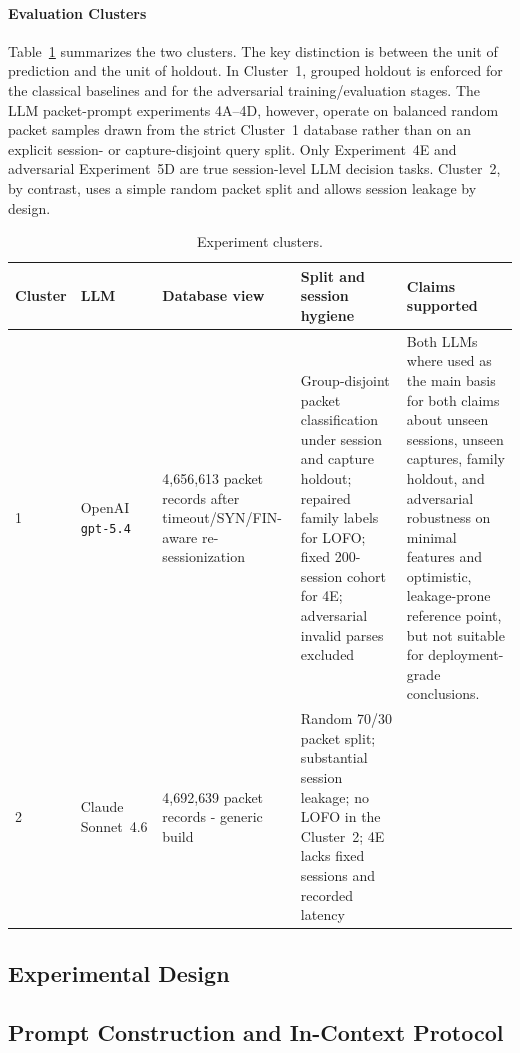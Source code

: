 \documentclass[conference]{IEEEtran}
\begin{document}
\paragraph{Evaluation Clusters}
Table~\ref{tab:clusters} summarizes the two clusters. The key distinction is between the unit of prediction and the unit of holdout. In Cluster~1, grouped holdout is enforced for the classical baselines and for the adversarial training/evaluation stages. The LLM packet-prompt experiments 4A--4D, however, operate on balanced random packet samples drawn from the strict Cluster~1 database rather than on an explicit session- or capture-disjoint query split. Only Experiment~4E and adversarial Experiment~5D are true session-level LLM decision tasks. Cluster~2, by contrast, uses a simple random packet split and allows session leakage by design.

\begin{table}[t]
\centering
\caption{Experiment clusters.}
\label{tab:clusters}
\footnotesize
\begin{tabularx}{\textwidth}{p{1.0cm}p{2.0cm}p{1.9cm}X X}
\toprule
Cluster & LLM & Database view & Split and session hygiene & Claims supported \\
\midrule
1 & OpenAI \texttt{gpt-5.4} & 4{,}656{,}613 packet records after timeout/SYN/FIN-aware re-sessionization & Group-disjoint packet classification under session and capture holdout; repaired family labels for LOFO; fixed 200-session cohort for 4E; adversarial invalid parses excluded & Both LLMs where used as the main basis for both claims about unseen sessions, unseen captures, family holdout, and adversarial robustness on minimal features and optimistic, leakage-prone reference point, but not suitable for deployment-grade conclusions. \\
2 & Claude Sonnet~4.6 & 4{,}692{,}639 packet records - generic build & Random 70/30 packet split; substantial session leakage; no LOFO in the Cluster~2; 4E lacks fixed sessions and recorded latency &  \\
\bottomrule
\end{tabularx}
\end{table}

\subsection{Experimental Design}

\subsection{Prompt Construction and In-Context Protocol}
\label{subsec:prompting}
\end{document}
